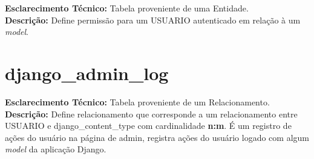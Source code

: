 \begin{apendicesenv}
\noindent\textbf{Esclarecimento Técnico:} Tabela proveniente de uma Entidade. \\
\textbf{Descrição:} Define permissão para um USUARIO autenticado em relação à um \textit{model}.

\begin{table}[h!]
\centering
\label{tab:auth_permission}
\end{table}

\newpage

\section*{django\_admin\_log}

\noindent\textbf{Esclarecimento Técnico:} Tabela proveniente de um Relacionamento. \\
\textbf{Descrição:} Define relacionamento que corresponde a um relacionamento entre USUARIO e django\_content\_type com cardinalidade \textbf{n:m}. É um registro de ações do usuário na página de admin, registra ações do usuário logado com algum \textit{model} da aplicação Django.


\end{apendicesenv}

